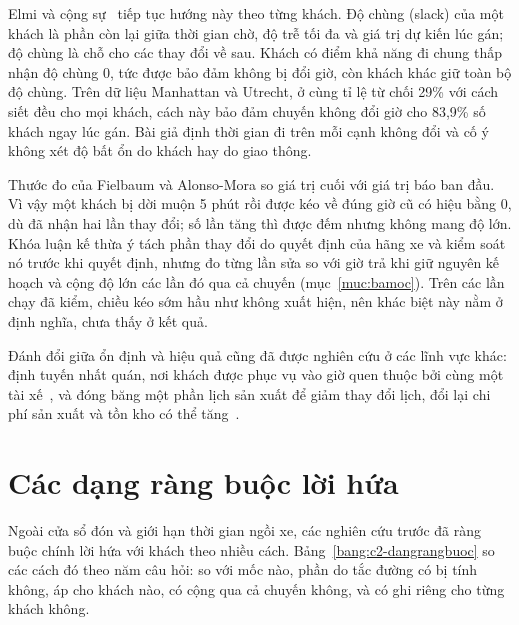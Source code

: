 Elmi và cộng sự~\cite{elmi2026} tiếp tục hướng này theo từng khách. Độ chùng (slack) của một khách là phần còn lại
giữa thời gian chờ, độ trễ tối đa và giá trị dự kiến lúc gán; độ chùng là chỗ cho các thay đổi về sau. Khách có điểm
khả năng đi chung thấp nhận độ chùng 0, tức được bảo đảm không bị đổi giờ, còn khách khác giữ toàn bộ độ chùng. Trên
dữ liệu Manhattan và Utrecht, ở cùng tỉ lệ từ chối 29\% với cách siết đều cho mọi khách, cách này bảo đảm chuyến
không đổi giờ cho 83,9\% số khách ngay lúc gán. Bài giả định thời gian đi trên mỗi cạnh không đổi và cố ý không xét
độ bất ổn do khách hay do giao thông.

Thước đo của Fielbaum và Alonso-Mora so giá trị cuối với giá trị báo ban đầu. Vì vậy một khách bị dời muộn 5 phút rồi
được kéo về đúng giờ cũ có hiệu bằng 0, dù đã nhận hai lần thay đổi; số lần tăng thì được đếm nhưng không mang độ
lớn. Khóa luận kế thừa ý tách phần thay đổi do quyết định của hãng xe và kiểm soát nó trước khi quyết định, nhưng đo
từng lần sửa so với giờ trả khi giữ nguyên kế hoạch và cộng độ lớn các lần đó qua cả chuyến (mục~\ref{muc:bamoc}).
Trên các lần chạy đã kiểm, chiều kéo sớm hầu như không xuất hiện, nên khác biệt này nằm ở định nghĩa, chưa thấy ở kết
quả.

Đánh đổi giữa ổn định và hiệu quả cũng đã được nghiên cứu ở các lĩnh vực khác: định tuyến nhất quán, nơi khách được
phục vụ vào giờ quen thuộc bởi cùng một tài xế~\cite{kovacs2014}, và đóng băng một phần lịch sản xuất để giảm thay
đổi lịch, đổi lại chi phí sản xuất và tồn kho có thể tăng~\cite{sridharan1987}.

\section{Các dạng ràng buộc lời hứa}
\label{muc:c2-rangbuoc}

Ngoài cửa sổ đón và giới hạn thời gian ngồi xe, các nghiên cứu trước đã ràng buộc chính lời hứa với khách theo nhiều
cách. Bảng~\ref{bang:c2-dangrangbuoc} so các cách đó theo năm câu hỏi: so với mốc nào, phần do tắc đường có bị tính
không, áp cho khách nào, có cộng qua cả chuyến không, và có ghi riêng cho từng khách không.


